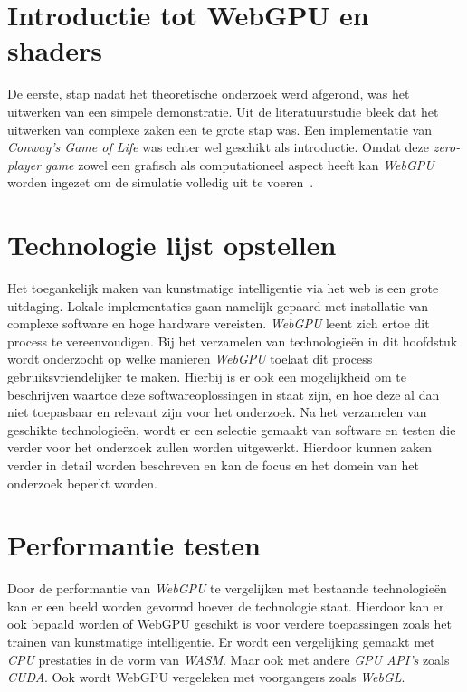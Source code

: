 \break{}

\section{Introductie tot WebGPU en shaders}

De eerste, stap nadat het theoretische onderzoek werd afgerond, was het uitwerken van een simpele demonstratie. Uit de literatuurstudie bleek dat het uitwerken van complexe zaken een te grote stap was. Een implementatie van \textit{Conway's Game of Life} was echter wel geschikt als introductie. Omdat deze 
\textit{zero-player game} zowel een grafisch als computationeel aspect heeft kan \textit{WebGPU} worden ingezet om de simulatie volledig uit te voeren~\autocite{google2023}.

\section{Technologie lijst opstellen}

Het toegankelijk maken van kunstmatige intelligentie via het web is een grote uitdaging. Lokale implementaties gaan namelijk gepaard met installatie van complexe software en hoge hardware vereisten. \textit{WebGPU} leent zich ertoe dit process te vereenvoudigen. Bij het verzamelen van technologieën in dit hoofdstuk wordt onderzocht op welke manieren \textit{WebGPU} toelaat dit process gebruiksvriendelijker te maken. Hierbij is er ook een mogelijkheid om te beschrijven waartoe deze softwareoplossingen in staat zijn, en hoe deze al dan niet toepasbaar en relevant zijn voor het onderzoek. Na het verzamelen van geschikte technologieën, wordt er een selectie gemaakt van software en testen die verder voor het onderzoek zullen worden uitgewerkt. Hierdoor kunnen zaken verder in detail worden beschreven en kan de focus en het domein van het onderzoek beperkt worden.

\section{Performantie testen}

Door de performantie van \textit{WebGPU} te vergelijken met bestaande technologieën kan er een beeld worden gevormd hoever de technologie staat. Hierdoor kan er ook bepaald worden of WebGPU geschikt is voor verdere toepassingen zoals het trainen van kunstmatige intelligentie. Er wordt een vergelijking gemaakt met \textit{CPU} prestaties in de vorm van \textit{WASM}. Maar ook met andere \textit{GPU API's} zoals \textit{CUDA}. Ook wordt WebGPU vergeleken met voorgangers zoals \textit{WebGL}.

